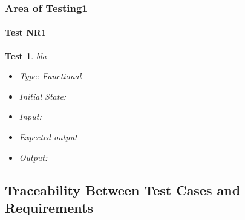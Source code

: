 \documentclass[12pt, titlepage]{article}
\newtheorem{Test}{Test}
\begin{document}
\subsubsection{Area of Testing1}
		
\paragraph{Test NR1}						

\begin{Test}\normalfont\underline{bla}
\begin{itemize}
\item Type: Functional
\item Initial State:
\item Input: 
\item Expected output
\item Output:  
\end{itemize}
\end{Test}	

\subsection{Traceability Between Test Cases and Requirements}


		



					
					
					
					
					
\end{document}

